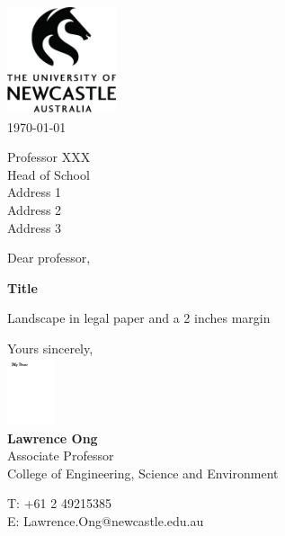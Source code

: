 \documentclass[11pt]{article}
\begin{document}
\thispagestyle{firstpage} %

\hfill \includegraphics[height=32mm,width=32mm]{uon_logo_white_square_tighter.pdf}\\
\today{}

\vspace{1.1em}

Professor XXX\\
Head of School\\
Address 1\\
Address 2\\
Address 3

\vspace{2em}

Dear professor,

\textbf{Title}

Landscape in legal paper and a 2 inches margin
\lipsum[2-15]


\vspace{3em}
Yours sincerely,\\
\includegraphics[height=2cm]{signature.pdf}\\
\textbf{Lawrence Ong}\\
Associate Professor\\
College of Engineering, Science and Environment

T: +61 2 49215385\\
E: Lawrence.Ong@newcastle.edu.au
\end{document}
